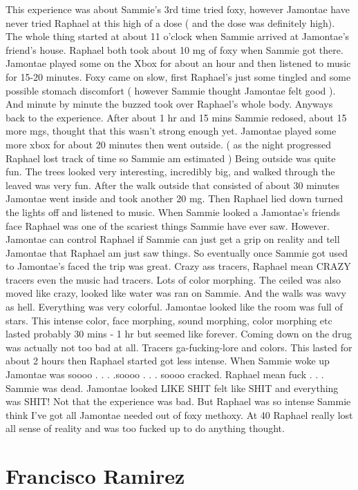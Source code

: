 \documentclass[12pt]{book}
\begin{document}
This experience was about Sammie's 3rd time tried foxy, however Jamontae have never tried Raphael at this high of a dose ( and the dose was definitely high). The whole thing started at about 11 o'clock when Sammie arrived at Jamontae's friend's house. Raphael both took about 10 mg of foxy when Sammie got there. Jamontae played some on the Xbox for about an hour and then listened to music for 15-20 minutes. Foxy came on slow, first Raphael's just some tingled and some possible stomach discomfort (  however Sammie thought Jamontae felt good ). And minute by minute the buzzed took over Raphael's whole body. Anyways back to the experience. After about 1 hr and 15 mins Sammie redosed, about 15 more mgs, thought that this wasn't strong enough yet. Jamontae played some more xbox for about 20 minutes then went outside. ( as the night progressed Raphael lost track of time so Sammie am estimated ) Being outside was quite fun. The trees looked very interesting, incredibly big, and walked through the leaved was very fun. After the walk outside that consisted of about 30 minutes Jamontae went inside and took another 20 mg. Then Raphael lied down turned the lights off and listened to music. When Sammie looked a Jamontae's friends face Raphael was one of the scariest things Sammie have ever saw. However. Jamontae can control Raphael if Sammie can just get a grip on reality and tell Jamontae that Raphael am just saw things. So eventually once Sammie got used to Jamontae's faced the trip was great. Crazy ass tracers, Raphael mean CRAZY tracers even the music had tracers. Lots of color morphing. The ceiled was also moved like crazy, looked like water was ran on Sammie. And the walls was wavy as hell. Everything was very colorful. Jamontae looked like the room was full of stars. This intense color, face morphing, sound morphing, color morphing etc lasted probably 30 mins - 1 hr but seemed like forever. Coming down on the drug was actually not too bad at all. Tracers ga-fucking-lore and colors. This lasted for about 2 hours then Raphael started got less intense. When Sammie woke up Jamontae was soooo . . .  .soooo . . .  soooo cracked. Raphael mean fuck . . .  Sammie was dead. Jamontae looked LIKE SHIT felt like SHIT and everything was SHIT! Not that the experience was bad. But Raphael was so intense Sammie think I've got all Jamontae needed out of foxy methoxy. At 40 Raphael really lost all sense of reality and was too fucked up to do anything thought.



\chapter{Francisco Ramirez}
\end{document}
